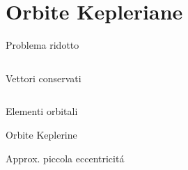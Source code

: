 \section{Orbite Kepleriane}

\begin{frame}{Problema ridotto}

\begin{columns}

\begin{column}{0.55\textwidth}



\end{column}

\begin{column}{0.45\textwidth}

\end{column}

\end{columns}

\end{frame}


\begin{frame}{Vettori conservati}

\begin{columns}

\begin{column}{0.55\textwidth}



\end{column}

\begin{column}{0.45\textwidth}

\end{column}

\end{columns}

\end{frame}

\begin{frame}{Elementi orbitali}

\end{frame}


\begin{frame}{Orbite Keplerine}

\end{frame}

\begin{frame}{Approx. piccola eccentricit\'a}

\end{frame}

